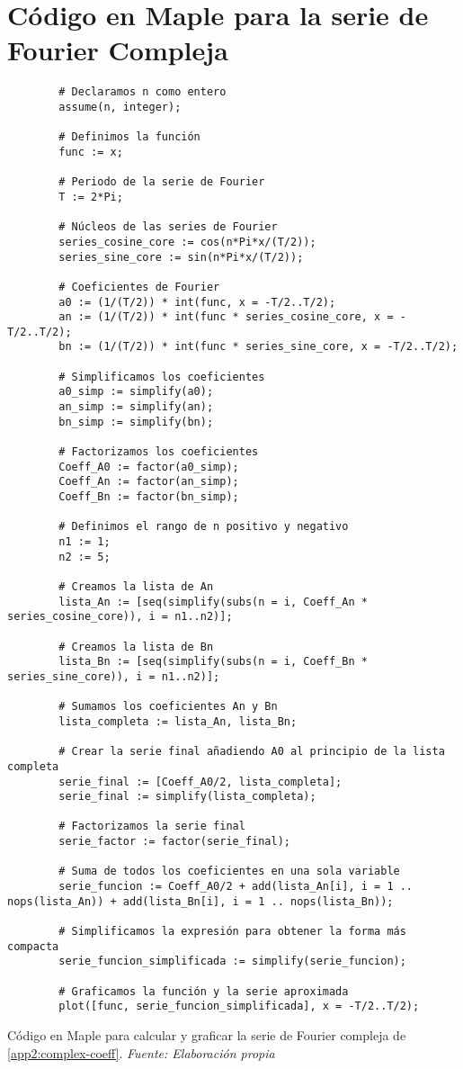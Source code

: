 \section{Código en Maple para la serie de Fourier Compleja}\label{app3:complex-code-maple}
\begin{longlisting}
	\begin{verbatim}
		# Declaramos n como entero
		assume(n, integer);
		
		# Definimos la función
		func := x;
		
		# Periodo de la serie de Fourier
		T := 2*Pi;
		
		# Núcleos de las series de Fourier
		series_cosine_core := cos(n*Pi*x/(T/2));
		series_sine_core := sin(n*Pi*x/(T/2));
		
		# Coeficientes de Fourier
		a0 := (1/(T/2)) * int(func, x = -T/2..T/2);
		an := (1/(T/2)) * int(func * series_cosine_core, x = -T/2..T/2);
		bn := (1/(T/2)) * int(func * series_sine_core, x = -T/2..T/2);
		
		# Simplificamos los coeficientes
		a0_simp := simplify(a0);
		an_simp := simplify(an);
		bn_simp := simplify(bn);
		
		# Factorizamos los coeficientes
		Coeff_A0 := factor(a0_simp);
		Coeff_An := factor(an_simp);
		Coeff_Bn := factor(bn_simp);
		
		# Definimos el rango de n positivo y negativo
		n1 := 1;
		n2 := 5;
		
		# Creamos la lista de An
		lista_An := [seq(simplify(subs(n = i, Coeff_An * series_cosine_core)), i = n1..n2)];
		
		# Creamos la lista de Bn
		lista_Bn := [seq(simplify(subs(n = i, Coeff_Bn * series_sine_core)), i = n1..n2)];
		
		# Sumamos los coeficientes An y Bn
		lista_completa := lista_An, lista_Bn;
		
		# Crear la serie final añadiendo A0 al principio de la lista completa
		serie_final := [Coeff_A0/2, lista_completa];
		serie_final := simplify(lista_completa);
		
		# Factorizamos la serie final
		serie_factor := factor(serie_final);
		
		# Suma de todos los coeficientes en una sola variable
		serie_funcion := Coeff_A0/2 + add(lista_An[i], i = 1 .. nops(lista_An)) + add(lista_Bn[i], i = 1 .. nops(lista_Bn));
		
		# Simplificamos la expresión para obtener la forma más compacta
		serie_funcion_simplificada := simplify(serie_funcion);
		
		# Graficamos la función y la serie aproximada
		plot([func, serie_funcion_simplificada], x = -T/2..T/2);	
	\end{verbatim}
	\caption[Código en Maple para calcular y graficar la serie de Fourier compleja de \ref{app2:complex-coeff}.] {Código en Maple para calcular y graficar la serie de Fourier compleja de \ref{app2:complex-coeff}. \textit{Fuente: Elaboración propia}} 
\end{longlisting}


